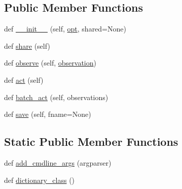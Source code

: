 \subsection*{Public Member Functions}
\begin{DoxyCompactItemize}
\item 
def \hyperlink{classparlai_1_1agents_1_1drqa_1_1drqa_1_1DrqaAgent_ab4fc521d734a88ec24fcc8ebb478fd11}{\+\_\+\+\_\+init\+\_\+\+\_\+} (self, \hyperlink{classparlai_1_1core_1_1agents_1_1Agent_ab3b45d2754244608c75d4068b90cd051}{opt}, shared=None)
\item 
def \hyperlink{classparlai_1_1agents_1_1drqa_1_1drqa_1_1DrqaAgent_a7346d6aa37ecb54779c9cf67a0ffef39}{share} (self)
\item 
def \hyperlink{classparlai_1_1agents_1_1drqa_1_1drqa_1_1DrqaAgent_a17be110f5f7cba058238fae60a420507}{observe} (self, \hyperlink{classparlai_1_1agents_1_1drqa_1_1drqa_1_1DrqaAgent_a31b47287b8b175d851b897aef7837990}{observation})
\item 
def \hyperlink{classparlai_1_1agents_1_1drqa_1_1drqa_1_1DrqaAgent_a2eac2d9d7425e7cbf19b06e2433205ff}{act} (self)
\item 
def \hyperlink{classparlai_1_1agents_1_1drqa_1_1drqa_1_1DrqaAgent_a5c2f02e9c1ddce46df0d216947227395}{batch\+\_\+act} (self, observations)
\item 
def \hyperlink{classparlai_1_1agents_1_1drqa_1_1drqa_1_1DrqaAgent_a654906588f91d21110921ad2ba498c95}{save} (self, fname=None)
\end{DoxyCompactItemize}
\subsection*{Static Public Member Functions}
\begin{DoxyCompactItemize}
\item 
def \hyperlink{classparlai_1_1agents_1_1drqa_1_1drqa_1_1DrqaAgent_a3469159780c52ff1a4d4309dddf250ff}{add\+\_\+cmdline\+\_\+args} (argparser)
\item 
def \hyperlink{classparlai_1_1agents_1_1drqa_1_1drqa_1_1DrqaAgent_a1d925f46a6b35d1f10cb033a1184841d}{dictionary\+\_\+class} ()
\end{DoxyCompactItemize}
